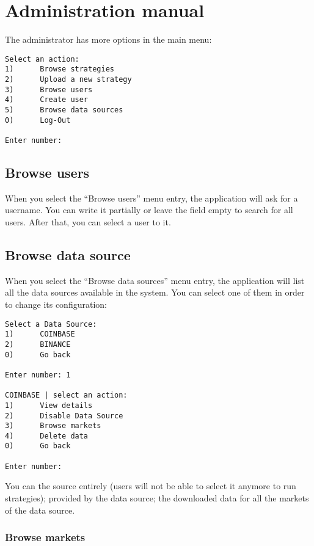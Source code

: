 \section{Administration manual}\label{sec:adminmanual}

The administrator has more options in the main menu:

\begin{verbatim}
Select an action:
1)      Browse strategies
2)      Upload a new strategy
3)      Browse users
4)      Create user
5)      Browse data sources
0)      Log-Out

Enter number:
\end{verbatim}

\subsection{Browse users}

When you select the ``Browse users'' menu entry, the application will ask for a
username. You can write it partially or leave the field empty to search for all
users. After that, you can select a user to  it.

\subsection{Browse data source}

When you select the ``Browse data sources'' menu entry, the application will
list all the data sources available in the system. You can select one of them in
order to change its configuration:

\begin{verbatim}
Select a Data Source:
1)      COINBASE
2)      BINANCE
0)      Go back

Enter number: 1

COINBASE | select an action:
1)      View details
2)      Disable Data Source
3)      Browse markets
4)      Delete data
0)      Go back

Enter number:
\end{verbatim}

You can  the source entirely (users will not be able to select
it anymore to run strategies);  provided by
the data source;  the downloaded data for all the markets of
the data source.

\subsubsection{Browse markets}

